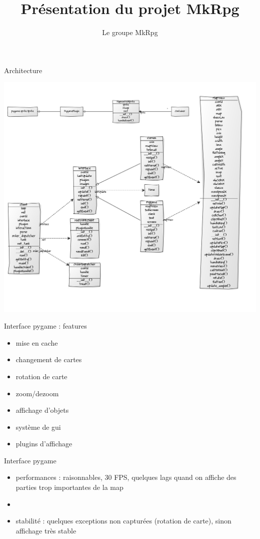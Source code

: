 \documentclass[11pt]{beamer}
\author{Le groupe MkRpg}
\title{Présentation du projet MkRpg}
\begin{document}
\begin{frame}{Architecture}
	\begin{center}\includegraphics[scale=0.21]{uml_pygame.png}\end{center}
\end{frame}

\begin{frame}{Interface pygame : features}
	\begin{itemize}
		\item mise en cache
    \item changement de cartes
    \item rotation de carte
    \item zoom/dezoom
    \item affichage d'objets
    \item système de gui
    \item plugins d'affichage
	\end{itemize}
\end{frame}

\begin{frame}{Interface pygame}
	\begin{itemize}
    \item performances : raisonnables, 30 FPS, quelques lags quand on affiche des parties trop importantes de la map
		\item[]
    \item stabilité : quelques exceptions non capturées (rotation de carte), sinon affichage très stable
	\end{itemize}
\end{frame}
\end{document}
